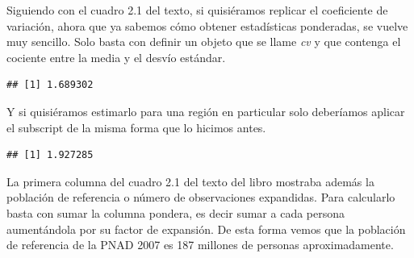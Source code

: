 \documentclass[
]{book}
\newenvironment{Shaded}{\begin{snugshade}}{\end{snugshade}}
\newcommand{\AttributeTok}[1]{\textcolor[rgb]{0.77,0.63,0.00}{#1}}
\newcommand{\DecValTok}[1]{\textcolor[rgb]{0.00,0.00,0.81}{#1}}
\newcommand{\FunctionTok}[1]{\textcolor[rgb]{0.00,0.00,0.00}{#1}}
\newcommand{\NormalTok}[1]{#1}
\newcommand{\OtherTok}[1]{\textcolor[rgb]{0.56,0.35,0.01}{#1}}
\newcommand{\SpecialCharTok}[1]{\textcolor[rgb]{0.00,0.00,0.00}{#1}}
\begin{document}
Siguiendo con el cuadro 2.1 del texto, si quisiéramos replicar el coeficiente de variación, ahora que ya sabemos cómo obtener estadísticas ponderadas, se vuelve muy sencillo. Solo basta con definir un objeto que se llame \emph{cv} y que contenga el cociente entre la media y el desvío estándar.

\begin{Shaded}
\end{Shaded}

\begin{verbatim}
## [1] 1.689302
\end{verbatim}

Y si quisiéramos estimarlo para una región en particular solo deberíamos aplicar el subscript de la misma forma que lo hicimos antes.

\begin{Shaded}
\end{Shaded}

\begin{verbatim}
## [1] 1.927285
\end{verbatim}

La primera columna del cuadro 2.1 del texto del libro mostraba además la población de referencia o número de observaciones expandidas. Para calcularlo basta con sumar la columna pondera, es decir sumar a cada persona aumentándola por su factor de expansión. De esta forma vemos que la población de referencia de la PNAD 2007 es 187 millones de personas aproximadamente.
\end{document}
